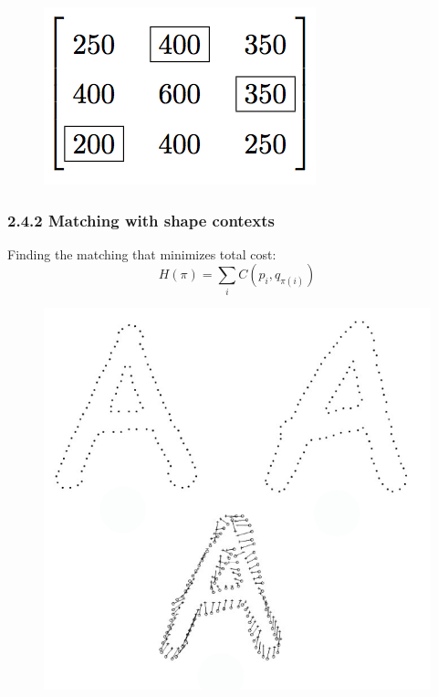 \documentclass[notheorems,serif,table,compress]{beamer}  %
\begin{document}
\begin{frame}
\begin{description}
\begin{figure}
              \begin{minipage}[t]{0.25\linewidth}
              \includegraphics[width=1\linewidth]{5}
              \end{minipage}
            \end{figure}
\end{description}
\end{frame}

\begin{frame}
\frametitle{2.4.2 Matching with shape contexts}
Finding the matching that minimizes total cost:
        \begin{displaymath}
        H(\pi)=\sum_{i}C(p_{i},q_{\pi(i)})
        \end{displaymath}
        \begin{figure}
        \includegraphics[width=0.35\linewidth]{pointmatch} 
        \end{figure}
\end{frame}
\end{document}
